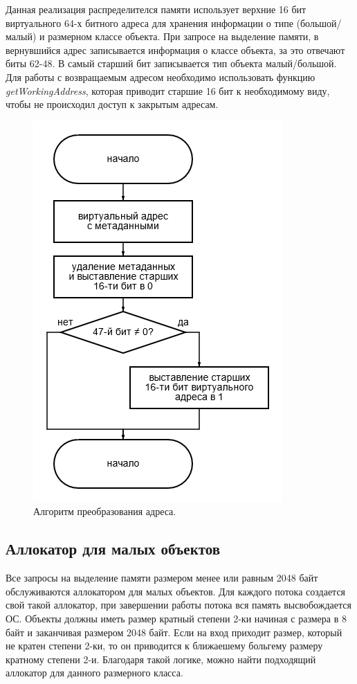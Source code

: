 Данная реализация распределителся памяти использует верхние 16 бит виртуального 64-х битного адреса для хранения информации о типе (большой/малый) и размерном классе объекта. При запросе на выделение памяти, в вернувшийся адрес записывается информация о классе объекта, за это отвечают биты 62-48. В самый старший бит записывается тип объекта малый/большой.\cite{page-tables} Для работы с возвращаемым адресом необходимо использовать функцию \textit{getWorkingAddress}, которая приводит старшие 16 бит к необходимому виду, чтобы не происходил доступ к закрытым адресам.

\begin{figure}[!h]
	\begin{center}
		\includegraphics[scale=0.5]{images/address-casting.png}
		\caption{Алгоритм преобразования адреса.}
		\label{structure}
	\end{center}
\end{figure}

\subsection{Аллокатор для малых объектов}
Все запросы на выделение памяти размером менее или равным 2048 байт обслуживаются аллокатором для малых объектов. Для каждого потока создается свой такой аллокатор, при завершении работы потока вся память высвобождается ОС. Объекты должны иметь размер кратный степени 2-ки начиная с размера в 8 байт и заканчивая размером 2048 байт. Если на вход приходит размер, который не кратен степени 2-ки, то он приводится к ближаешему больгему размеру кратному степени 2-и. Благодаря такой логике, можно найти подходящий аллокатор для данного размерного класса.

